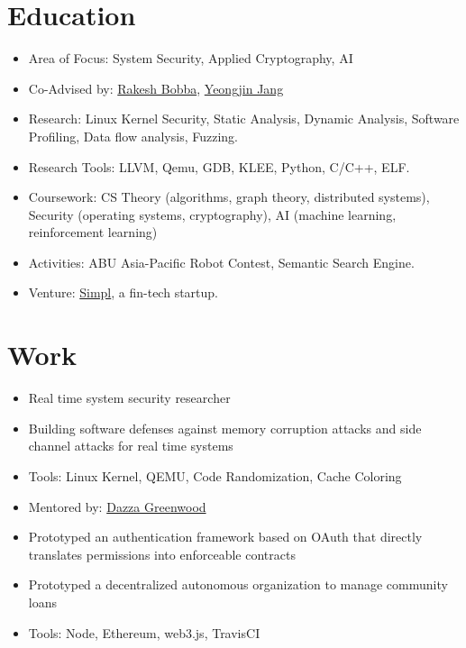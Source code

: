 \documentclass[11pt,a4paper,sans]{moderncv}
\begin{document}
\section{Education}
{
    \begin{itemize}
    \item Area of Focus: System Security, Applied Cryptography, AI
    \item Co-Advised by:
    \href{https://eecs.oregonstate.edu/people/bobba-rakesh}{Rakesh Bobba},
    \href{https://www.unexploitable.systems/}{Yeongjin Jang}
    \item Research: Linux Kernel Security, Static Analysis, Dynamic Analysis,
    Software Profiling, Data flow analysis, Fuzzing.
    \item Research Tools: LLVM, Qemu, GDB, KLEE, Python, C/C++, ELF.
    \item Coursework: CS Theory (algorithms, graph theory, distributed systems),
    Security (operating systems, cryptography), AI (machine learning,
    reinforcement learning)
    \end{itemize}
}
{
    \begin{itemize}
    \item Activities: ABU Asia-Pacific Robot Contest, Semantic Search Engine.
    \item Venture: \href{https://www.getsimpl.com}{Simpl}, a fin-tech startup.
    \end{itemize}
}

\section{Work}

{
    \begin{itemize}
    \item Real time system security researcher
    \item Building software defenses against memory corruption attacks and side
    channel attacks for real time systems
    \item Tools: Linux Kernel, QEMU, Code Randomization, Cache Coloring
    \end{itemize}
}

{
    \begin{itemize}
    \item Mentored by: \href{https://web.media.mit.edu/~dang/}{Dazza Greenwood}
    \item Prototyped an authentication framework based on OAuth that directly
    translates permissions into enforceable contracts
    \item Prototyped a decentralized autonomous organization to manage community
        loans
    \item Tools: Node, Ethereum, web3.js, TravisCI
    \end{itemize}
}
\end{document}
